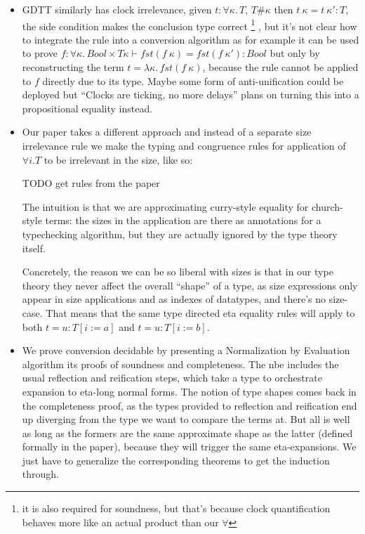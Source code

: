 \documentclass{book}
\newcommand{\sd}{.\,}
\begin{document}
    \begin{itemize}
    \item GDTT similarly has clock irrelevance, given $t : \forall
    \kappa\sd T$, $T \# \kappa$ then $t~\kappa = t~\kappa' : T$, the
    side condition makes the conclusion type correct
    \footnote{it is also required for soundness, but that's because
      clock quantification behaves more like an actual product than
      our $\forall$}
    , but it's not clear how to integrate the rule into a conversion
    algorithm as for example it can be used to prove
    $f : \forall \kappa\sd Bool \times T \kappa \vdash fst (f~\kappa) = fst (f~\kappa') : Bool$
    but only by reconstructing the term $t = \lambda \kappa\sd fst
    (f~\kappa)$, because the rule cannot be applied to $f$ directly
    due to its type.
    Maybe some form of anti-unification could be deployed but ``Clocks
    are ticking, no more delays'' plans on turning this into a
    propositional equality instead.

    \item Our paper takes a different approach and instead of a separate
    size irrelevance rule we make the typing and congruence rules for
    application of $\forall i. T$ to be irrelevant in the size, like so:

      TODO get rules from the paper

   The intuition is that we are approximating curry-style equality for
   church-style terms: the sizes in the application are there as
   annotations for a typechecking algorithm, but they are actually
   ignored by the type theory itself.

   Concretely, the reason we can be so liberal with sizes is that
   in our type theory they never affect the overall ``shape'' of a
   type, as size expressions only appear in size applications and as
   indexes of datatypes, and there's no size-case. That means that the
   same type directed eta equality rules will apply to both $t = u :
   T[i:=a]$ and $t = u : T[i:=b]$.

   \item We prove conversion decidable by presenting a Normalization by
   Evaluation algorithm its proofs of soundness and completeness.
   The nbe includes the usual reflection and reification steps, which
   take a type to orchestrate expansion to eta-long normal forms.
   The notion of type shapes comes back in the completeness proof, as
   the types provided to reflection and reification end up diverging
   from the type we want to compare the terms at.
   But all is well as long as the formers are the same approximate
   shape as the latter (defined formally in the paper), because they
   will trigger the same eta-expansions.
   We just have to generalize the corresponding theorems to get the
   induction through.


\end{itemize}
\end{document}
